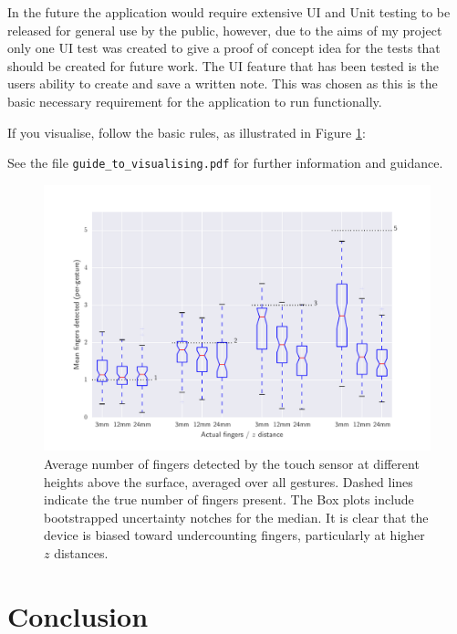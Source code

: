 \documentclass{l4proj}
\begin{document}
In the future the application would require extensive UI and Unit testing to be released for general use by the public, however, due
to the aims of my project only one UI test was created to give a proof of concept idea for the tests that should be created for future
work. The UI feature that has been tested is the users ability to create and save a written note. This was chosen as this is the 
basic necessary requirement for the application to run functionally. 
\par 
If you visualise, follow the basic rules, as illustrated in Figure \ref{fig:boxplot}:
\par 
See the file \texttt{guide\_to\_visualising.pdf} for further information and guidance.
\begin{figure}
    \centering
    \includegraphics[width=1.0\linewidth]{images/boxplot_finger_distance.pdf}    

    \caption{Average number of fingers detected by the touch sensor at different heights above the surface, averaged over all gestures. Dashed lines indicate
    the true number of fingers present. The Box plots include bootstrapped uncertainty notches for the median. It is clear that the device is biased toward 
    undercounting fingers, particularly at higher $z$ distances.
    }

    \label{fig:boxplot} 
\end{figure}


\chapter{Conclusion}  
\end{document}

